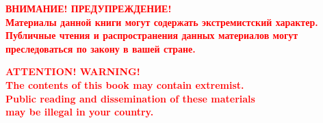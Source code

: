 \pagecolor{black}
\vspace*{\fill}
\begin{center}
\textbf{\textcolor{red}{\Large\MakeUppercase{Внимание! Предупреждение!}\large\\
Материалы данной книги могут содержать экстремистский характер.
Публичные чтения и распространения данных материалов могут преследоваться по закону в вашей стране.}}\\
\vspace*{2cm}

\textbf{\textcolor{red}{\Large\uppercase{Attention! Warning!}\large\\
The contents of this book may contain extremist.\\
Public reading and dissemination of these materials\\
may be illegal in your country.}}
\end{center}
\vspace*{\fill}
\pagecolor{white}